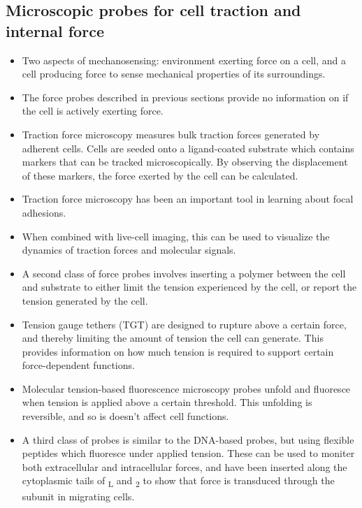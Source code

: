 \documentclass[
10pt, %
letterpaper, %
twocolumn, %
landscape %
]{article}
\newcommand{\inta}[1]{\textalpha\textsubscript{#1}}
\newcommand{\intb}[1]{\textbeta\textsubscript{#1}}
\begin{document}
\subsection{Microscopic probes for cell traction and internal force}
\label{sec:micr-prob-cell}

\begin{itemize}
\item Two aspects of mechanosensing: environment exerting force on a
  cell, and a cell producing force to sense mechanical properties of
  its surroundings.  %
\item The force probes described in previous sections provide no
  information on if the cell is actively exerting force. 
\item Traction force microscopy measures bulk traction forces
  generated by adherent cells. Cells are seeded onto a ligand-coated
  substrate which contains markers that can be tracked
  microscopically. By observing the displacement of these markers, the
  force exerted by the cell can be calculated.
\item Traction force microscopy has been an important tool in learning
  about focal adhesions.
\item When combined with live-cell imaging, this can be used to
  visualize the dynamics of traction forces and molecular signals.
\item A second class of force probes involves inserting a polymer
  between the cell and substrate to either limit the tension
  experienced by the cell, or report the tension generated by the
  cell.
\item Tension gauge tethers (TGT) are designed to rupture above a
  certain force, and thereby limiting the amount of tension the cell
  can generate. This provides information on how much tension is
  required to support certain force-dependent functions.
\item Molecular tension-based fluorescence microscopy probes unfold
  and fluoresce when tension is applied above a certain
  threshold. This unfolding is reversible, and so is doesn't affect
  cell functions.
\item A third class of probes is similar to the DNA-based probes, but
  using flexible peptides which fluoresce under applied tension. These
  can be used to moniter both extracellular and intracellular forces,
  and have been inserted along the cytoplasmic tails of \inta{L} and
  \intb{2} to show that force is transduced through the \intb{}
  subunit in migrating cells.
\end{itemize}
\end{document}
